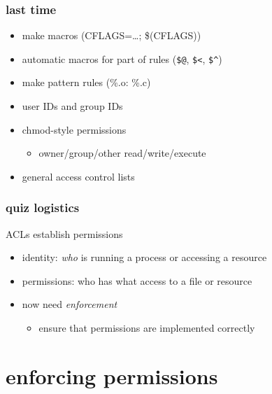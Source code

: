 \date{}
\title{}
\date{}

\begin{frame}
    \titlepage
\end{frame}

\begin{FragileFrame}
\frametitle{last time}
    \begin{itemize}
    \item make macros (CFLAGS=\ldots; \$(CFLAGS))
    \item automatic macros for part of rules (\verb|$@|, \verb|$<|, \verb|$^|)
    \item make pattern rules (\%.o: \%.c)
    \vspace{.5cm}
    \item user IDs and group IDs
    \item chmod-style permissions
        \begin{itemize}
        \item owner/group/other read/write/execute
        \end{itemize}
    \item general access control lists
    \end{itemize}
\end{FragileFrame}

\begin{frame}
\frametitle{quiz logistics}
\end{frame}

\begin{frame}{ACLs establish permissions}
    \begin{itemize}
        \item identity: \textit{who} is running a process or accessing a resource
        \item permissions: who has what access to a file or resource
        \item now need \textit{enforcement}
            \begin{itemize}
            \item ensure that permissions are implemented correctly
            \end{itemize}
    \end{itemize}
\end{frame}



\section{enforcing permissions}


